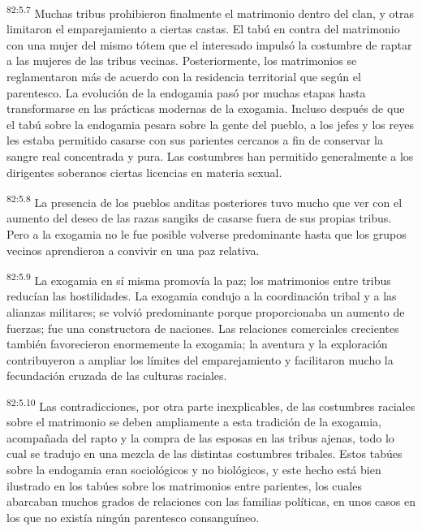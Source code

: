 \par
\textsuperscript{82:5.7} Muchas tribus prohibieron finalmente el matrimonio dentro del clan, y otras limitaron el emparejamiento a ciertas castas. El tabú en contra del matrimonio con una mujer del mismo tótem que el interesado impulsó la costumbre de raptar a las mujeres de las tribus vecinas. Posteriormente, los matrimonios se reglamentaron más de acuerdo con la residencia territorial que según el parentesco. La evolución de la endogamia pasó por muchas etapas hasta transformarse en las prácticas modernas de la exogamia. Incluso después de que el tabú sobre la endogamia pesara sobre la gente del pueblo, a los jefes y los reyes les estaba permitido casarse con sus parientes cercanos a fin de conservar la sangre real concentrada y pura. Las costumbres han permitido generalmente a los dirigentes soberanos ciertas licencias en materia sexual.

\par
\textsuperscript{82:5.8} La presencia de los pueblos anditas posteriores tuvo mucho que ver con el aumento del deseo de las razas sangiks de casarse fuera de sus propias tribus. Pero a la exogamia no le fue posible volverse predominante hasta que los grupos vecinos aprendieron a convivir en una paz relativa.

\par
\textsuperscript{82:5.9} La exogamia en sí misma promovía la paz; los matrimonios entre tribus reducían las hostilidades. La exogamia condujo a la coordinación tribal y a las alianzas militares; se volvió predominante porque proporcionaba un aumento de fuerzas; fue una constructora de naciones. Las relaciones comerciales crecientes también favorecieron enormemente la exogamia; la aventura y la exploración contribuyeron a ampliar los límites del emparejamiento y facilitaron mucho la fecundación cruzada de las culturas raciales.

\par
\textsuperscript{82:5.10} Las contradicciones, por otra parte inexplicables, de las costumbres raciales sobre el matrimonio se deben ampliamente a esta tradición de la exogamia, acompañada del rapto y la compra de las esposas en las tribus ajenas, todo lo cual se tradujo en una mezcla de las distintas costumbres tribales. Estos tabúes sobre la endogamia eran sociológicos y no biológicos, y este hecho está bien ilustrado en los tabúes sobre los matrimonios entre parientes, los cuales abarcaban muchos grados de relaciones con las familias políticas, en unos casos en los que no existía ningún parentesco consanguíneo.

